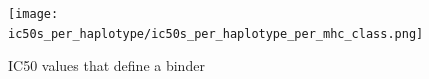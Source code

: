 \begin{figure}[!htbp]
  \texttt{[image: ic50s\_per\_haplotype/ic50s\_per\_haplotype\_per\_mhc\_class.png]}
  \caption{
    IC50 values that define a binder
  }
  \label{fig:ic50s_per_haplotype}
\end{figure}











